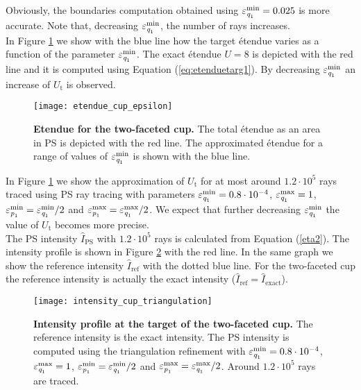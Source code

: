  Obviously, the boundaries computation obtained using $\varepsilon_{\textit{q}_1}^{\textrm{min}} = 0.025$ is more accurate. 
Note that, decreasing $\varepsilon_{\textit{q}_1}^{\textrm{min}}$, the number of rays increases. 
\\ \indent In Figure \ref{fig:etendue_cup} we show with the blue line how the target \'{e}tendue varies as a function of the parameter $\varepsilon_{\textit{q}_1}^{\textrm{min}}$. The exact \'{e}tendue $U=8$ is depicted with the red line and it is computed using Equation (\ref{eq:etenduetarg1}). By decreasing $\varepsilon_{\textit{q}_1}^{\textrm{min}}$ an increase of $U_{\textrm{t}}$ is observed. %
 \begin{figure}[t]
  \center
  \texttt{[image: etendue\_cup\_epsilon]}
  \caption{\textbf{Etendue for the two-faceted cup.} The total \'{e}tendue as an area in PS is depicted with the red line. The approximated \'{e}tendue for a range of values of 
$\varepsilon_{\textit{q}_1}^{\textrm{min}}$ is shown with the blue line.}
  \label{fig:etendue_cup}
\end{figure}
In Figure \ref{fig:etendue_cup} we show the approximation of $U_{\textrm{t}}$ for at most around $1.2 \cdot 10^5$ rays traced using PS ray tracing with parameters $\varepsilon_{\textit{q}_1}^{\textrm{min}}=0.8\cdot 10^{-4}$, $\varepsilon_{\textit{q}_1}^{\textrm{max}}=1$, $\varepsilon_{\textit{p}_1}^{\textrm{min}}=\varepsilon_{\textit{q}_1}^{\textrm{min}}/2$ and $\varepsilon_{\textit{p}_1}^{\textrm{max}}= \varepsilon_{\textit{q}_1}^{\textrm{max}}/2$. We expect that further decreasing $\varepsilon_{\textit{q}_1}^{\textrm{min}}$ the value of $U_{\textrm{t}}$ becomes more precise. 
\\ \indent The PS intensity $\hat{I}_{\textrm{PS}}$ with $1.2 \cdot 10^5$ rays is calculated from Equation (\ref{eta2}). The intensity profile is shown in Figure \ref{fig:intensity_cup_triangulation} with the red line. In the same graph we show the reference intensity $\hat{I}_{\textrm{ref}}$ with the dotted blue line. For the two-faceted cup the reference intensity is actually the exact intensity ($\hat{I}_{\textrm{ref}}= \hat{I}_{\textrm{exact}}$). 
 \begin{figure}[h!]
  \center
  \texttt{[image: intensity\_cup\_triangulation]}
  \caption{\textbf{Intensity profile at the target of the two-faceted cup.} The reference intensity is the exact intensity. The PS intensity is computed using the triangulation refinement with $\varepsilon_{\textit{q}_1}^{\textrm{min}}=0.8\cdot 10^{-4}$, $\varepsilon_{\textit{q}_1}^{\textrm{max}}=1$, $\varepsilon_{\textit{p}_1}^{\textrm{min}}=\varepsilon_{\textit{q}_1}^{\textrm{min}}/2$ and $\varepsilon_{\textit{p}_1}^{\textrm{max}}= \varepsilon_{\textit{q}_1}^{\textrm{max}}/2$. Around $1.2 \cdot 10^5$ rays are traced.}
  \label{fig:intensity_cup_triangulation}
\end{figure}
